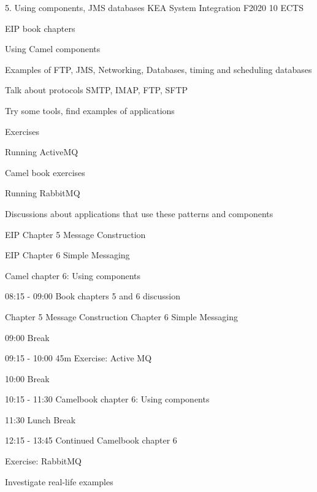 \documentclass[Screen16to9,17pt]{foils}
\begin{document}
\mytitlepage
{5. Using components, JMS
 databases}
{KEA System Integration F2020 10 ECTS}


\begin{list2}
\item EIP book chapters
\item Using Camel components
\item Examples of FTP, JMS, Networking, Databases, timing and scheduling
 databases
\item Talk about protocols SMTP, IMAP, FTP, SFTP
\item Try some tools, find examples of applications
\end{list2}

Exercises
\begin{list2}
\item Running ActiveMQ
\item Camel book exercises
\item Running RabbitMQ
\item Discussions about applications that use these patterns and components
\end{list2}




\begin{list1}
\item EIP Chapter 5 Message Construction
\item EIP Chapter 6 Simple Messaging
\item Camel chapter 6: Using components

\end{list1}




\begin{list2}
\item 08:15 - 09:00 Book chapters 5 and 6 discussion
\item Chapter 5 Message Construction Chapter 6 Simple Messaging
\item 09:00 Break
\item 09:15 - 10:00 45m Exercise: Active MQ
\item 10:00 Break
\item 10:15 - 11:30 Camelbook chapter 6: Using components
\item 11:30 Lunch Break
\item 12:15 - 13:45 Continued Camelbook chapter 6
\item Exercise: RabbitMQ
\item Investigate real-life examples
\end{list2}
\end{document}
